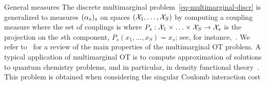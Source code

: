\begin{rem2}{General measures}
The discrete multimarginal problem~\eqref{eq-multimarginal-discr} is generalized to measures $(\alpha_s)_s$ on spaces $(\mathcal{X}_1,\ldots,\mathcal{X}_S)$ by computing a coupling measure 
where the set of couplings is 
where $P_s : \mathcal{X}_1 \times \ldots \times \mathcal{X}_S \rightarrow \mathcal{X}_s$ is the projection on the $s$th component, $P_s(x_1,\ldots,x_S)=x_s$; see, for instance,~\citep{GangboSciech}.
%
We refer to~\citep{PassMultiReview,PassMultiMarginalStructure} for a review of the main properties of the multimarginal OT problem. 
%
A typical application of multimarginal OT is to compute approximation of solutions to quantum chemistry problems, and in particular, in density functional theory~\citep{CotarDFT,GorSeiVig,BuDePGor}. This problem is obtained when considering the singular Coulomb interaction cost
\end{rem2}



